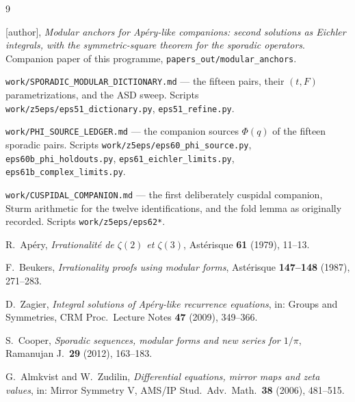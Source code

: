 \documentclass[11pt,reqno]{amsart}
\theoremstyle{plain}
\theoremstyle{definition}
\theoremstyle{remark}
\begin{document}
\begin{thebibliography}{9}

[author], \emph{Modular anchors for Ap\'ery-like companions: second
solutions as Eichler integrals, with the symmetric-square theorem for the
sporadic operators}. Companion paper of this programme,
\texttt{papers\_out/modular\_anchors}.

\texttt{work/SPORADIC\_MODULAR\_DICTIONARY.md} --- the fifteen pairs, their
$(t,F)$ parametrizations, and the ASD sweep. Scripts
\texttt{work/z5eps/eps51\_dictionary.py}, \texttt{eps51\_refine.py}.

\texttt{work/PHI\_SOURCE\_LEDGER.md} --- the companion sources $\Phi(q)$ of
the fifteen sporadic pairs. Scripts \texttt{work/z5eps/eps60\_phi\_source.py},
\texttt{eps60b\_phi\_holdouts.py}, \texttt{eps61\_eichler\_limits.py},
\texttt{eps61b\_complex\_limits.py}.

\texttt{work/CUSPIDAL\_COMPANION.md} --- the first deliberately cuspidal
companion, Sturm arithmetic for the twelve identifications, and the fold
lemma as originally recorded. Scripts \texttt{work/z5eps/eps62*}.

R.~Ap\'ery, \emph{Irrationalit\'e de $\zeta(2)$ et $\zeta(3)$},
Ast\'erisque \textbf{61} (1979), 11--13.

F.~Beukers, \emph{Irrationality proofs using modular forms},
Ast\'erisque \textbf{147--148} (1987), 271--283.

D.~Zagier, \emph{Integral solutions of Ap\'ery-like recurrence equations},
in: Groups and Symmetries, CRM Proc.\ Lecture Notes \textbf{47} (2009),
349--366.

S.~Cooper, \emph{Sporadic sequences, modular forms and new series for
$1/\pi$}, Ramanujan J.\ \textbf{29} (2012), 163--183.

G.~Almkvist and W.~Zudilin, \emph{Differential equations, mirror maps and
zeta values}, in: Mirror Symmetry V, AMS/IP Stud.\ Adv.\ Math.\
\textbf{38} (2006), 481--515.

\end{thebibliography}
\end{document}

